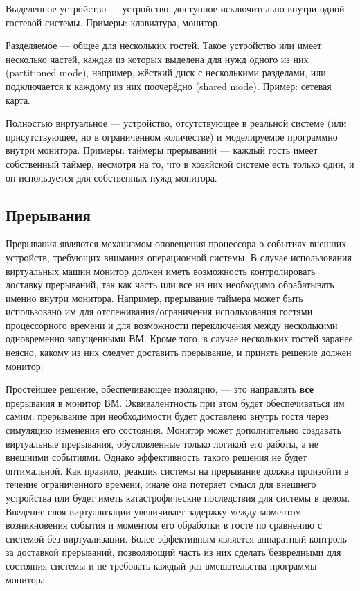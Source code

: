 \begin{description*}
    \item[Выделенное устройство] --- устройство, доступное исключительно внутри одной гостевой системы. Примеры: клавиатура, монитор.
    \item[Разделяемое] --- общее для нескольких гостей. Такое устройство или имеет несколько частей, каждая из которых  выделена для нужд одного из них (\abbr partitioned mode), например, жёсткий диск с несколькими разделами, или подключается к каждому из них поочерёдно (\abbr shared mode). Пример: сетевая карта.
    \item[Полностью виртуальное] --- устройство, отсутствующее в реальной системе (или присутствующее, но в ограниченном количестве) и моделируемое программно внутри монитора. Примеры: таймеры прерываний --- каждый гость имеет собственный таймер, несмотря на то, что в хозяйской системе есть только один, и он используется для собственных нужд монитора.
\end{description*}


\subsection{Прерывания}

Прерывания являются механизмом оповещения процессора о событиях внешних устройств, требующих внимания операционной системы. В случае использования виртуальных машин монитор должен иметь возможность контролировать доставку прерываний, так как часть или все из них необходимо обрабатывать именно внутри монитора. Например, прерывание таймера может быть использовано им для отслеживания/ограничения использования гостями процессорного времени и для возможности переключения между несколькими одновременно запущенными ВМ. Кроме того, в случае нескольких гостей заранее неясно, какому из них следует доставить прерывание, и принять решение должен монитор.

Простейшее решение, обеспечивающее изоляцию, --- это направлять \textbf{все} прерывания в монитор ВМ. Эквивалентность при этом будет обеспечиваться им самим: прерывание при необходимости будет доставлено внутрь гостя через симуляцию изменения его состояния. Монитор может дополнительно создавать виртуальные прерывания, обусловленные только логикой его работы, а не внешними событиями. Однако эффективность такого решения не будет оптимальной. Как правило, реакция системы на прерывание должна произойти в течение ограниченного времени, иначе она потеряет смысл для внешнего устройства или будет иметь катастрофические последствия для системы в целом. Введение слоя виртуализации увеличивает задержку между моментом  возникновения события и моментом его обработки в госте по сравнению с системой без виртуализации. Более эффективным является аппаратный контроль за доставкой прерываний, позволяющий часть из них сделать безвредными для состояния системы и не требовать каждый раз вмешательства программы монитора.

